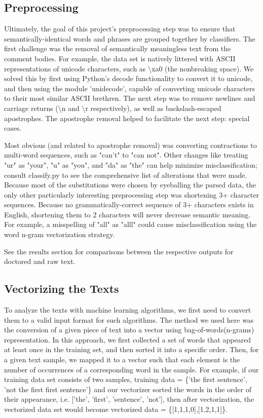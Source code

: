 \documentclass[11pt]{article}
\begin{document}
\subsection{Preprocessing}
Ultimately, the goal of this project's preprocessing step was to ensure that
semantically-identical words and phrases are grouped together by classifiers.
The first challenge was the removal of semantically meaningless text from the
comment bodies. For example, the data set is natively littered with ASCII
representations of unicode characters, such as \textbackslash xa0 (the
nonbreaking space). We solved this by first using Python's decode functionality
to convert it to unicode, and then using the module 'unidecode', capable of
converting unicode characters to their most similar ASCII brethren.  The next
step was to remove newlines and carriage returns (\textbackslash n and
\textbackslash r respectively), as well as backslash-escaped apostrophes. The
apostrophe removal helped to facilitate the next step: special cases.

Most obvious (and related to apostrophe removal) was converting contractions to
multi-word sequences, such as "can't" to "can not". Other changes like treating
"ur" as "your", "u" as "you", and "da" as "the" can help minimize
misclassification; consult classify.py to see the comprehensive list of
alterations that were made.  Because most of the substitutions were chosen by
eyeballing the parsed data, the only other particularly interesting
preprocessing step was shortening 3+ character sequences. Because no
grammatically-correct sequence of 3+ characters exists in English, shortening
them to 2 characters will never decrease semantic meaning.  For example, a
misspelling of "all" as "alll" could cause misclassification using the word
n-gram vectorization strategy.

See the results section for comparisons between the respective outputs for
doctored and raw text.

\subsection{Vectorizing the Texts}

To analyze the texts with machine learning algorithms, we first need to convert
them to a valid input format for such algorithms. The method we used here was
the conversion of a given piece of text into a vector using
bag-of-words(n-grams) representation. In this approach, we first collected a
set of words that appeared at least once in the training set, and then sorted
it into a specific order. Then, for a given text sample, we mapped it to a
vector such that each element is the number of occurrences of a corresponding
word in the sample. For example, if our training data set consists of two
samples, training data = \{'the first sentence', 'not the first first
sentence'\} and our vectorizer sorted the words in the order of their
appearance, i.e. ['the', 'first', 'sentence', 'not'], then after vectorization,
the vectorized data set would become vectorized data = \{[1,1,1,0],[1,2,1,1]\}.
\end{document}
